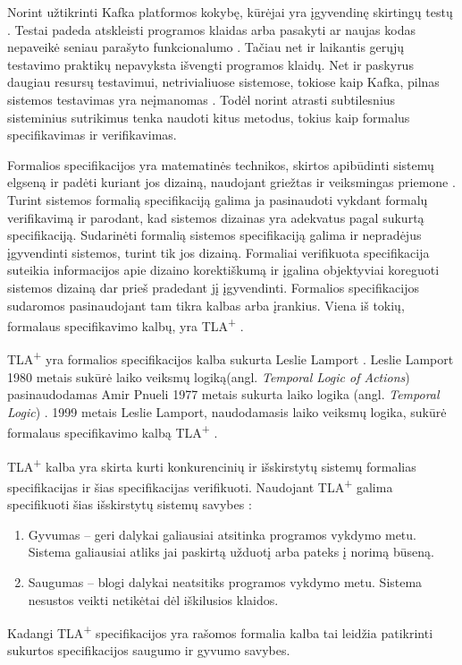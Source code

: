 \documentclass{VUMIFPSmagistrinis}
\begin{document}
		Norint užtikrinti Kafka platformos kokybę, kūrėjai yra įgyvendinę skirtingų testų \cite{kfkGH}.
		Testai padeda atskleisti programos klaidas arba pasakyti ar naujas kodas nepaveikė seniau parašyto funkcionalumo \cite{819971}.
		Tačiau net ir laikantis gerųjų testavimo praktikų nepavyksta išvengti programos klaidų.
		Net ir paskyrus daugiau resursų testavimui, netrivialiuose sistemose, tokiose kaip Kafka, pilnas sistemos testavimas yra neįmanomas \cite{sullivan2004software}.
		Todėl norint atrasti subtilesnius sisteminius sutrikimus tenka naudoti kitus metodus, tokius kaip formalus specifikavimas ir verifikavimas.


		Formalios specifikacijos yra matematinės technikos, skirtos apibūdinti sistemų elgseną ir padėti kuriant jos dizainą, naudojant griežtas ir veiksmingas priemone \cite{holzmann1995improvement}.
		Turint sistemos formalią specifikaciją galima ja pasinaudoti vykdant formalų verifikavimą ir parodant, kad sistemos dizainas yra adekvatus pagal sukurtą specifikaciją.
		Sudarinėti formalią sistemos specifikaciją galima ir nepradėjus įgyvendinti sistemos, turint tik jos dizainą. 
		Formaliai verifikuota specifikacija suteikia informacijos apie dizaino korektiškumą ir įgalina objektyviai koreguoti sistemos dizainą dar prieš pradedant jį įgyvendinti.
		Formalios specifikacijos sudaromos pasinaudojant tam tikra kalbas arba įrankius.
		Viena iš tokių, formalaus specifikavimo kalbų, yra TLA\textsuperscript{+} \cite{lamport2002specifying}.
		

		TLA\textsuperscript{+} yra formalios specifikacijos kalba sukurta Leslie Lamport \cite{lamport2002specifying}.
		Leslie Lamport 1980 metais sukūrė laiko veiksmų logiką(angl. {\it Temporal Logic of Actions}) \cite{10.1145/177492.177726} pasinaudodamas Amir Pnueli 1977 metais sukurta laiko logika (angl. {\it Temporal Logic}) \cite{4567924}.
		1999 metais Leslie Lamport, naudodamasis laiko veiksmų logika, sukūrė formalaus specifikavimo kalbą TLA\textsuperscript{+} \cite{lamport2002specifying}.
		

TLA\textsuperscript{+} kalba yra skirta kurti konkurencinių ir išskirstytų sistemų formalias specifikacijas ir šias specifikacijas verifikuoti.
		Naudojant TLA\textsuperscript{+} galima specifikuoti šias išskirstytų sistemų savybes \cite{lamport2019safety} :
		\begin{enumerate}
			\item{Gyvumas -- geri dalykai galiausiai atsitinka programos vykdymo metu. Sistema galiausiai atliks jai paskirtą užduotį arba pateks į norimą būseną.}
			\item{Saugumas -- blogi dalykai neatsitiks programos vykdymo metu. Sistema nesustos veikti netikėtai dėl iškilusios klaidos.}
		\end{enumerate}
		Kadangi TLA\textsuperscript{+} specifikacijos yra rašomos formalia kalba tai leidžia patikrinti sukurtos specifikacijos saugumo ir gyvumo savybes.
		
\end{document}
